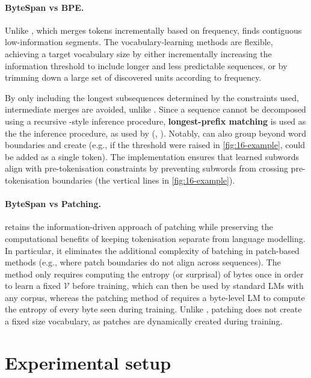 \paragraph{ByteSpan vs BPE.}

Unlike \bpe, which merges tokens incrementally based on frequency, \bytespan finds contiguous low-information segments. The vocabulary-learning methods are flexible, achieving a target vocabulary size by either incrementally increasing the information threshold to include longer and less predictable sequences, or by trimming down a large set of discovered units according to frequency.

By only including the longest subsequences determined by the constraints used, intermediate merges are avoided, unlike \bpe. Since a sequence cannot be decomposed using a recursive \bpe-style inference procedure, \textbf{longest-prefix matching} is used as the the inference procedure, as used by \wordpiecefull (\wordpiece, \citealp{schuster-nakajima-2012-voice}). Notably, \bytespan can also group beyond word boundaries and create  (e.g., if the threshold were raised in \cref{fig:16-example},  could be added as a single token). The implementation ensures that learned subwords align with \bpe pre-tokenisation constraints by preventing subwords from crossing pre-tokenisation boundaries (the vertical lines in \cref{fig:16-example}).

\paragraph{ByteSpan vs Patching.}
\bytespan retains the information-driven approach of patching while preserving the computational benefits of keeping tokenisation separate from language modelling. In particular, it eliminates the additional complexity of batching in patch-based methods (e.g., where patch boundaries do not align across sequences). The method only requires computing the entropy (or surprisal) of bytes once in order to learn a fixed \(\mathcal{V}\) before training, which can then be used by standard LMs with any corpus, whereas the patching method of \citet{pagnoni2024byte} requires a byte-level LM to compute the entropy of every byte seen during training. Unlike \bytespan, patching does not create a fixed size vocabulary, as patches are dynamically created during training.

\section{Experimental setup}\label{sec:16-setup}


